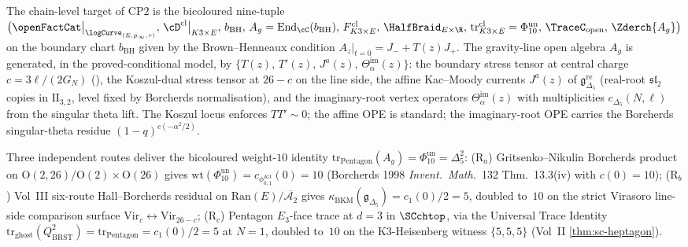 \begin{remark}[Bicoloured primitive package and three routes to the
Pentagon weight $\Phi_{10}^{\mathrm{un}} = \Delta_5^{2}$]
\label{rem:gravity-line-three-route-pentagon}
The chain-level target of CP2 is the bicoloured nine-tuple
$\bigl(\openFactCat\big|_{\logCurve_{(E, p_\infty, \tau)}},\,
\cD^{\mathrm{cl}}\big|_{K3 \times E},\,b_{\mathrm{BH}},\,
A_g = \mathrm{End}_\cC(b_{\mathrm{BH}}),\,F^{\mathrm{cl}}_{K3 \times E},\,
{\HalfBraid}_{E \times \R},\,\mathrm{tr}^{\mathrm{cl}}_{K3 \times E}
= \Phi_{10}^{\mathrm{un}},\,\TraceC_{\mathrm{open}},\,
\Zderch{A_g}\bigr)$
on the boundary chart $b_{\mathrm{BH}}$ given by the Brown--Henneaux
condition $A_z|_{t = 0} = J_- + T(z) J_+$. The gravity-line open
algebra $A_g$ is generated, in the proved-conditional model, by
$\{T(z),\, T'(z),\, J^a(z),\, \Theta^{\mathrm{im}}_\alpha(z)\}$:
the boundary stress tensor at central charge $c = 3 \ell / (2 G_N)$
(\cite{BH86}), the Koszul-dual stress tensor at $26 - c$ on the
line side, the affine Kac--Moody currents
$J^a(z)$ of $\mathfrak g_{\Delta_5}^{\mathrm{re}}$ (real-root
$\mathfrak{sl}_2$ copies in $\mathrm{II}_{3, 2}$, level fixed by
Borcherds normalisation), and the imaginary-root vertex operators
$\Theta^{\mathrm{im}}_\alpha(z)$ with multiplicities
$c_{\Delta_5}(N, \ell)$ from the singular theta lift. The Koszul
locus enforces $TT' \sim 0$; the affine OPE is standard; the
imaginary-root OPE carries the Borcherds singular-theta residue
$(1 - q)^{c(-\alpha^2 / 2)}$.

Three independent routes deliver the bicoloured weight-$10$
identity $\mathrm{tr}_{\mathrm{Pentagon}}(A_g) = \Phi_{10}^{\mathrm{un}}
= \Delta_5^{2}$:
\textup{(R$_a$)} Gritsenko--Nikulin Borcherds product on
$\mathrm{O}(2, 26)/\mathrm{O}(2) \times \mathrm{O}(26)$ gives
$\mathrm{wt}(\Phi_{10}^{\mathrm{un}}) = c_{\phi_{0, 1}^{K3}}(0) = 10$
(Borcherds 1998 \emph{Invent.\ Math.}~132 Thm.~13.3(iv) with
$c(0) = 10$); \textup{(R$_b$)} Vol~III six-route Hall--Borcherds
residual on $\mathrm{Ran}(E) / \overline{\mathcal A_2}$ gives
$\kappa_{\mathrm{BKM}}(\mathfrak g_{\Delta_5}) = c_1(0)/2 = 5$, doubled
to~$10$ on the strict Virasoro line-side comparison surface
$\mathrm{Vir}_c \leftrightarrow \mathrm{Vir}_{26 - c}$;
\textup{(R$_c$)} Pentagon $E_3$-face trace at $d = 3$ in
$\SCchtop$, via the Universal Trace Identity
$\mathrm{tr}_{\mathrm{ghost}}(Q_{\mathrm{BRST}}^2) =
\mathrm{tr}_{\mathrm{Pentagon}} = c_1(0)/2 = 5$ at $N = 1$, doubled
to~$10$ on the K3-Heisenberg witness $\{5, 5, 5\}$ \textup{(}Vol~II
\cref{thm:sc-heptagon}\textup{)}.


\end{remark}
